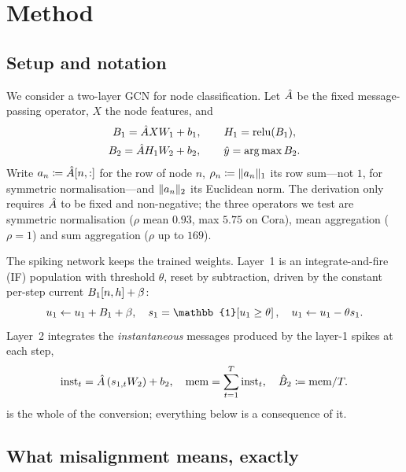 \section{Method}
\label{sec:method}

\subsection{Setup and notation}
\label{sec:setup}

We consider a two-layer GCN for node classification. Let $\hat{A}$ be the fixed message-passing
operator, $X$ the node features, and
\begin{equation}
\begin{gathered}
B_{1} = \hat{A} X W_{1} + b_{1},\qquad H_{1} = \mathrm{relu}(B_{1}),\\
B_{2} = \hat{A} H_{1} W_{2} + b_{2},\qquad \hat{y} = \arg\max B_{2} .
\end{gathered}
\label{eq:gcn}
\end{equation}
Write $a_{n} \coloneqq \hat{A}[n,:]$ for the row of node $n$, $\rho_{n} \coloneqq \lVert a_{n}\rVert_{1}$
its row sum---not $1$, for symmetric normalisation---and $\lVert a_{n}\rVert_{2}$ its Euclidean norm. The
derivation only requires $\hat{A}$ to be fixed and non-negative; the three operators we test are
symmetric normalisation ($\rho$ mean $0.93$, max $5.75$ on Cora), mean aggregation ($\rho = 1$) and
sum aggregation ($\rho$ up to $169$).

The spiking network keeps the trained weights. Layer~1 is an integrate-and-fire (IF) population with
threshold $\theta$, reset by subtraction, driven by the constant per-step current
$B_{1}[n,h] + \beta$:
\begin{equation}
u_{1} \leftarrow u_{1} + \Bone + \beta,\quad
s_{1} = \mathbb{1}\!\left[u_{1} \ge \theta\right],\quad
u_{1} \leftarrow u_{1} - \theta s_{1}.
\label{eq:if}
\end{equation}
Layer~2 integrates the \emph{instantaneous} messages produced by the layer-1 spikes at each step,
\begin{equation}
\mathrm{inst}_{t} = \hat{A}\left(s_{1,t} W_{2}\right) + b_{2},\quad
\mathrm{mem} = \sum_{t=1}^{T} \mathrm{inst}_{t},\quad
\hat{B}_{2} \coloneqq \mathrm{mem}/T .
\label{eq:layer2}
\end{equation}
 is the whole of the conversion; everything below is a consequence of it.

\subsection{What misalignment means, exactly}
\label{sec:align}

